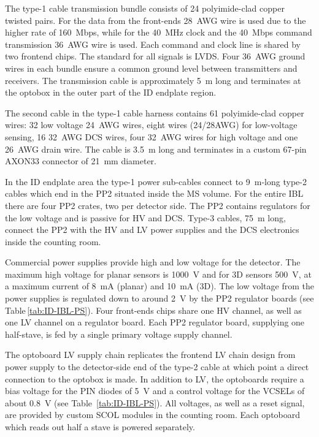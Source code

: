 \documentclass[cernpreprint, atlasdraft=false, UKenglish,british,orcidlogo, texmf, orcidlogo]{atlasdoc}
\begin{document}
 
The type-1 cable transmission bundle consists of 24 polyimide-clad copper twisted pairs.
For the data from the front-ends \SI{28}{\gls{AWG}} wire is used due to the higher rate of \SI{160}{Mbps}, while for
the \SI{40}{\MHz} clock and the \SI{40}{Mbps} command transmission \SI{36}{\gls{AWG}} wire is used. Each command and clock line
is shared by two frontend chips. The standard for all signals is \gls{LVDS}. Four \SI{36}{\gls{AWG}} ground wires in each
bundle ensure a common ground level between transmitters and receivers. The transmission
cable is approximately \SI{5}{\m} long and terminates at the optobox in the outer part of the \gls{ID} endplate region.
 
The second cable in the type-1 cable harness contains 61 polyimide-clad copper wires: 32 low voltage \SI{24}{\gls{AWG}} wires,
eight wires (24/28\gls{AWG}) for low-voltage sensing, 16 \SI{32}{\gls{AWG}} \gls{DCS} wires, four \SI{32}{\gls{AWG}} wires for high voltage and
one \SI{26}{\gls{AWG}} drain wire. The cable is \SI{3.5}{\m} long and terminates in a custom 67-pin AXON33 connector of \SI{21}{\mm}
diameter.
 
In the \gls{ID} endplate area the type-1 power sub-cables connect to \SI{9}{\m}-long type-2 cables which end in the \gls{PP2}
situated inside the \gls{MS} volume. For the entire \gls{IBL} there are four \gls{PP2}
crates, two per detector side.
The \gls{PP2} contains regulators for the low voltage and is passive for \gls{HV} and \gls{DCS}. Type-3 cables, \SI{75}{\m} long, connect the \gls{PP2} with the \gls{HV} and \gls{LV} power supplies and the \gls{DCS} electronics inside the counting room.
 
Commercial power supplies provide high and low voltage for the detector. The maximum high voltage for planar sensors is \SI{1000}{\volt} and for 3D sensors \SI{500}{\volt}, at a maximum current of \SI{8}{\milli\ampere} (planar) and \SI{10}{\milli\ampere} (3D). The low voltage from the power supplies is regulated down to around \SI{2}{\volt} by the \gls{PP2} regulator boards (see Table\,\ref{tab:ID-IBL-PS}). Four front-ends chips share one \gls{HV} channel, as well as one \gls{LV} channel on a regulator board. Each \gls{PP2} regulator board, supplying one half-stave, is fed by a single primary voltage supply channel.
 
The optoboard \gls{LV} supply chain replicates the frontend \gls{LV} chain design from power supply to the detector-side end of
the type-2 cable at which point a direct connection to the optobox is made.
In addition to \gls{LV}, the optoboards require a bias voltage for the \gls{PIN} diodes of \SI{5}{\V} and a control voltage for the VCSELs of about \SI{0.8}{\V} (see Table~\ref{tab:ID-IBL-PS}).
All voltages, as well as a reset signal, are provided by custom \gls{SCOL} modules in the counting room.
Each optoboard which reads out half a stave is powered separately.
 
\end{document}
